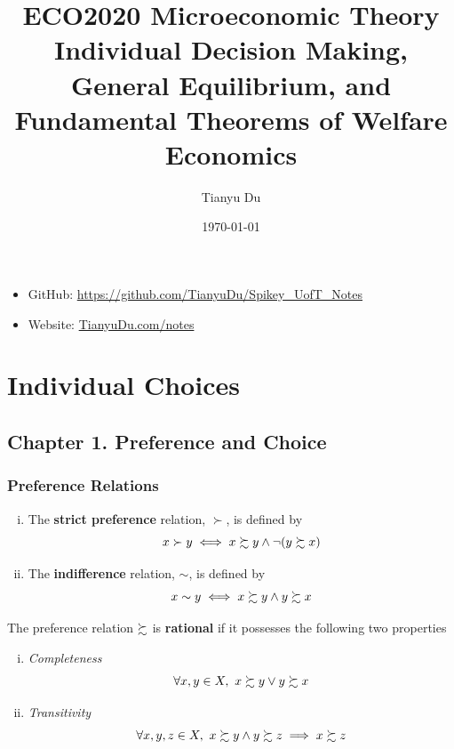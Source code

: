 \documentclass{report}
\title{ECO2020 Microeconomic Theory\\ \small Individual Decision Making, General Equilibrium, and Fundamental Theorems of Welfare Economics}
\date{\today}
\author{Tianyu Du}
\begin{document}
	\maketitle
	\doclicenseThis
	\begin{itemize}
		\item GitHub: \url{https://github.com/TianyuDu/Spikey_UofT_Notes}
		\item Website: \url{TianyuDu.com/notes}
	\end{itemize}
	\tableofcontents
	
	\chapter{Individual Choices}
	\section{Chapter 1. Preference and Choice}
	\subsection{Preference Relations}
	
		\begin{definition} \quad
			\begin{enumerate}[(i)]
				\item The \textbf{strict preference} relation, $\succ$, is defined by
					\begin{equation}
						x \succ y \iff x \succsim y \land \neg (y \succsim x)
					\end{equation}
				\item The \textbf{indifference} relation, $\sim$, is defined by
					\begin{equation}
						x \sim y \iff x \succsim y \land y \succsim x
					\end{equation}
			\end{enumerate}
		\end{definition}
	
		\begin{definition}[1.B.1]
			The preference relation $\succsim$ is \textbf{rational} if it possesses the following two properties
			\begin{enumerate}[(i)]
				\item \emph{Completeness} 
					\begin{equation}
						\forall x, y \in X,\ x \succsim y \lor y \succsim x
					\end{equation}
				\item \emph{Transitivity}
					\begin{equation}
						\forall x, y, z \in X,\ x \succsim y \land y \succsim z \implies x \succsim z
					\end{equation}
			\end{enumerate}
		\end{definition}
	
\end{document}
